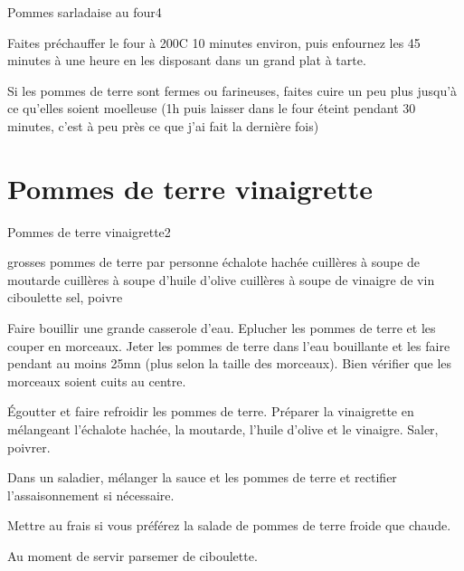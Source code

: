 {\begin{recette}{Pommes sarladaise au four}{4}{}{}
\begin{cuisson}
Faites préchauffer le four à 200\degres C 10 minutes environ, puis enfournez les 45 minutes à une heure en les disposant dans un grand plat 
à tarte.

Si les pommes de terre sont fermes ou farineuses, faites cuire un peu plus jusqu'à ce qu'elles soient moelleuse (1h puis laisser dans le four éteint pendant 30 minutes, c'est à peu près ce que j'ai fait la dernière fois)
\end{cuisson}
\end{recette}

\section{Pommes de terre vinaigrette}
\begin{recette}{Pommes de terre vinaigrette}{2}{}{}
\begin{ingredients}
 grosses pommes de terre par personne
 échalote hachée
 cuillères à soupe de moutarde
 cuillères à soupe d'huile d'olive
 cuillères à soupe de vinaigre de vin
\ingredient ciboulette
\ingredient sel, poivre
\end{ingredients}

\begin{preparation}
\etape Faire bouillir une grande casserole d'eau. Eplucher les pommes de terre et les couper en morceaux. Jeter les pommes de 
terre dans l'eau bouillante et les faire pendant au moins 25mn (plus selon la taille des morceaux). Bien vérifier que les 
morceaux soient cuits au centre.

\etape Égoutter et faire refroidir les pommes de terre. Préparer la vinaigrette en mélangeant l'échalote hachée, la moutarde, 
l'huile d'olive et le vinaigre. Saler, poivrer.

\etape Dans un saladier, mélanger la sauce et les pommes de terre et rectifier l'assaisonnement si nécessaire.

\begin{remarque}
Mettre au frais si vous préférez la salade de pommes de terre froide que chaude.
\end{remarque}

\etape Au moment de servir parsemer de ciboulette.
\end{preparation}
\end{recette}

}
